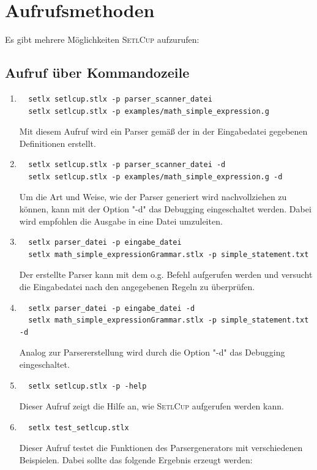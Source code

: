 \section{Aufrufsmethoden}
Es gibt mehrere Möglichkeiten \textsc{SetlCup} aufzurufen:
\subsection{Aufruf über Kommandozeile}
\begin{enumerate}
	\item \begin{Verbatim}
  setlx setlcup.stlx -p parser_scanner_datei
  setlx setlcup.stlx -p examples/math_simple_expression.g
	\end{Verbatim}
			Mit diesem Aufruf wird ein Parser gemäß der in der Eingabedatei gegebenen Definitionen erstellt.
	\item \begin{Verbatim}
  setlx setlcup.stlx -p parser_scanner_datei -d
  setlx setlcup.stlx -p examples/math_simple_expression.g -d
	\end{Verbatim}
			Um die Art und Weise, wie der Parser generiert wird nachvollziehen zu können, kann mit der Option "-d" das Debugging eingeschaltet werden. Dabei wird empfohlen die Ausgabe in eine Datei umzuleiten.
	\item \begin{Verbatim}
  setlx parser_datei -p eingabe_datei
  setlx math_simple_expressionGrammar.stlx -p simple_statement.txt
	\end{Verbatim}
	Der erstellte Parser kann mit dem o.g. Befehl aufgerufen werden und versucht die Eingabedatei nach den angegebenen Regeln zu überprüfen.
		\item \begin{Verbatim}
  setlx parser_datei -p eingabe_datei -d
  setlx math_simple_expressionGrammar.stlx -p simple_statement.txt -d
	\end{Verbatim}
	Analog zur Parsererstellung wird durch die Option "-d" das Debugging eingeschaltet.
	\item \begin{Verbatim}
  setlx setlcup.stlx -p -help
	\end{Verbatim}
			Dieser Aufruf zeigt die Hilfe an, wie \textsc{SetlCup} aufgerufen werden kann.
	\item \begin{Verbatim}
  setlx test_setlcup.stlx
	\end{Verbatim}
			Dieser Aufruf testet die Funktionen des Parsergenerators mit verschiedenen Beispielen. Dabei sollte das folgende Ergebnis erzeugt werden:

\end{enumerate}
